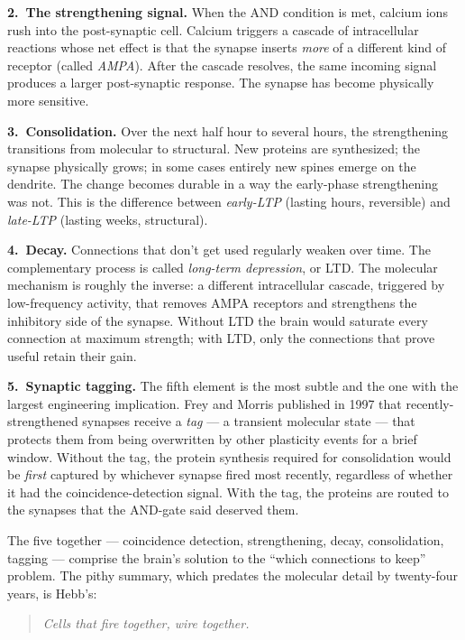 \documentclass[twoside,nobib]{tufte-book}
\begin{document}
\textbf{2.\ The strengthening signal.} When the AND condition is
met, calcium ions rush into the post-synaptic cell. Calcium
triggers a cascade of intracellular reactions whose net effect is
that the synapse inserts \emph{more} of a different kind of
receptor (called \emph{AMPA}). After the cascade resolves, the
same incoming signal produces a larger post-synaptic response. The
synapse has become physically more sensitive.

\textbf{3.\ Consolidation.} Over the next half hour to several
hours, the strengthening transitions from molecular to structural.
New proteins are synthesized; the synapse physically grows; in
some cases entirely new spines emerge on the dendrite. The change
becomes durable in a way the early-phase strengthening was not.
This is the difference between \emph{early-LTP} (lasting hours,
reversible) and \emph{late-LTP} (lasting weeks, structural).

\textbf{4.\ Decay.} Connections that don't get used regularly
weaken over time. The complementary process is called
\emph{long-term depression}, or LTD. The molecular mechanism is
roughly the inverse: a different intracellular cascade, triggered
by low-frequency activity, that removes AMPA receptors and
strengthens the inhibitory side of the synapse. Without LTD the
brain would saturate every connection at maximum strength; with
LTD, only the connections that prove useful retain their gain.

\textbf{5.\ Synaptic tagging.} The fifth element is the most
subtle and the one with the largest engineering implication.
Frey and Morris published in 1997 that recently-strengthened
synapses receive a \emph{tag} --- a transient molecular state ---
that protects them from being overwritten by other plasticity
events for a brief window. Without the tag, the protein synthesis
required for consolidation would be \emph{first} captured by
whichever synapse fired most recently, regardless of whether it
had the coincidence-detection signal. With the tag, the proteins
are routed to the synapses that the AND-gate said deserved them.

The five together --- coincidence detection, strengthening, decay,
consolidation, tagging --- comprise the brain's solution to the
``which connections to keep'' problem. The pithy summary, which
predates the molecular detail by twenty-four years, is Hebb's:

\begin{quote}\itshape
Cells that fire together, wire together.
\end{quote}
\end{document}

